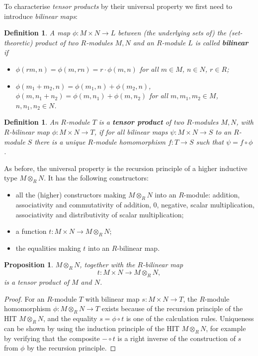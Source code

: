\documentclass{amsart}
\theoremstyle{plain}
\numberwithin{equation}{section} %
\numberwithin{figure}{section} %
\theoremstyle{plain}
\theoremstyle{plain}
\theoremstyle{plain}
\theoremstyle{plain}
\theoremstyle{plain}
\newtheorem{prop}[thm]{Proposition} %
\theoremstyle{plain}
\newtheorem{Def}[thm]{Definition} %
\theoremstyle{remark}
\theoremstyle{remark}
\theoremstyle{remark}
\begin{document}
To characterise \textit{tensor products} by their universal property we first need to introduce \textit{bilinear maps}:
\begin{Def}
A map $\phi: M \times N \rightarrow L$ between (the underlying sets of) the (set-theoretic) product of two $R$-modules $M, N$ and an $R$-module $L$ is called \textbf{bilinear} if
\begin{itemize}
\item[(i)] $\phi(rm, n) = \phi(m, rn) = r \cdot \phi(m,n)$ for all $m \in M$, $n \in N$, $r \in R$;
\item[(ii)] $\phi(m_1 + m_2, n) = \phi(m_1, n) + \phi(m_2,n)$, $\phi(m, n_1 + n_2) = \phi(m,n_1) + \phi(m,n_2)$ for all $m,m_1, m_2 \in M$, $n, n_1, n_2 \in N$.
\end{itemize}
\end{Def}
\begin{Def}
An $R$-module $T$ is a \textbf{tensor product} of two $R$-modules $M, N$, with $R$-bilinear map $\phi: M \times N \rightarrow T$, if for all bilinear maps $\psi: M \times N \rightarrow S$ to an $R$-module $S$ there is a unique $R$-module homomorphism $f: T \rightarrow S$ such that $\psi = f \circ \phi$. 
\end{Def}

As before, the universal property is the recursion principle of a higher inductive type $M \otimes_R N$. It has the following constructors:
\begin{itemize}
\item all the (higher) constructors making $M \otimes_R N$ into an $R$-module: addition, associativity and commutativity of addition, $0$, negative, scalar multiplication, associativity and distributivity of scalar multiplication;
\item a function $t: M \times N \rightarrow M \otimes_R N$;
\item the equalities making $t$ into an $R$-bilinear map.
\end{itemize}
\begin{prop}
$M \otimes_R N$, together with the $R$-bilinear map 
\[ t: M \times N \rightarrow M \otimes_R N, \] 
is a tensor product of $M$ and $N$.
\end{prop}
\begin{proof}
For an $R$-module $T$ with bilinear map $s: M \times N \rightarrow T$, the $R$-module homomorphism $\phi: M \otimes_R N \rightarrow T$ exists because of the recursion principle of the HIT $M \otimes_R N$, and the equality $s = \phi \circ t$ is one of the calculation rules. Uniqueness can be shown by using the induction principle of the HIT $M \otimes_R N$, for example by verifying that the composite $- \circ t$ is a right inverse of the construction of $s$ from $\phi$ by the recursion principle.
\end{proof}
\end{document}
